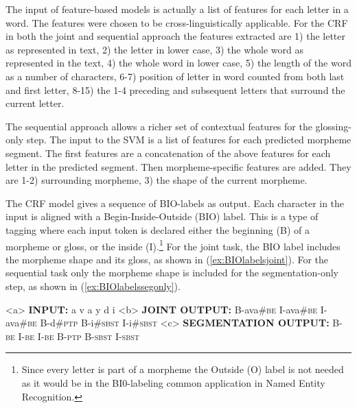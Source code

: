 The input of feature-based models is actually a list of features for each letter in a word. The features were chosen to be cross-linguistically applicable. For the CRF in both the joint and sequential approach the features extracted are 1) the letter as represented in text, 2) the letter in lower case, 3) the whole word as represented in the text, 4) the whole word in lower case, 5) the length of the word as a number of characters, 6-7) position of letter in word counted from both last and first letter, 8-15) the 1-4 preceding and subsequent letters that surround the current letter. 

The sequential approach allows a richer set of contextual features for the glossing-only step. The input to the SVM is a list of features for each predicted morpheme segment. The first features are a concatenation of the above features for each letter in the predicted segment. Then morpheme-specific features are added. They are 1-2) surrounding morpheme, 3) the shape of the current morpheme. 

The CRF model gives a sequence of BIO-labels \citep{ramshaw1999} as output. Each character in the input is aligned with a Begin-Inside-Outside (BIO) label. This is a type of tagging where each input token is declared either the beginning (B) of a morpheme or gloss, or the inside (I).\footnote{Since every letter is part of a morpheme the Outside (O) label is not needed as it would be in the BI0-labeling common application in Named Entity Recognition.} For the joint task, the BIO label includes the morpheme shape and its gloss, as shown in (\ref{ex:BIOlabelsjoint}). For the sequential task only the morpheme shape is included for the segmentation-only step, as shown in (\ref{ex:BIOlabelssegonly}). 

\pex   
\label{ex:BIOlabels}
\a<a> {\bf INPUT:} \hspace{3 mm}  a \hspace{2 mm}  v \hspace{2 mm} a \hspace{2 mm} y \hspace{2 mm} d \hspace{2 mm} i
\a<b> {\bf JOINT OUTPUT:} \hspace{.5 mm} B-ava\#\textsc{be} \hspace{.5 mm} I-ava\#\textsc{be}  \hspace{.5 mm} I-ava\#\textsc{be} \hspace{1 mm} B-d\#\textsc{ptp}  \hspace{.5 mm}B-i\#\textsc{sbst}  \hspace{.5 mm} I-i\#\textsc{sbst}
\label{ex:BIOlabelsjoint}
\a<c> {\bf SEGMENTATION OUTPUT:} \hspace{1 mm} B-\textsc{be} \hspace{1 mm} I-\textsc{be} \hspace{1 mm} I-\textsc{be} \hspace{1 mm} B-\textsc{ptp} \hspace{1 mm} B-\textsc{sbst} \hspace{1 mm} I-\textsc{sbst}
\label{ex:BIOlabelssegonly}
\xe

